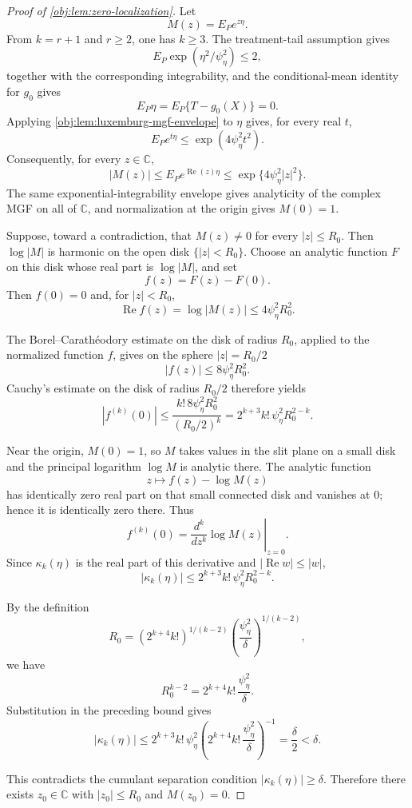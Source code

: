 \documentclass[11pt]{article}
\begin{document}
\begin{proof}[Proof of \cref{obj:lem:zero-localization}]
Let
\[
M(z)=E_Pe^{z\eta}.
\]
From \(k=r+1\) and \(r\ge2\), one has \(k\ge3\).  The treatment-tail assumption gives
\[
E_P\exp(\eta^2/\psi_\eta^2)\le2,
\]
together with the corresponding integrability, and the conditional-mean identity for \(g_0\) gives
\[
E_P\eta=E_P\{T-g_0(X)\}=0.
\]
Applying \cref{obj:lem:luxemburg-mgf-envelope} to \(\eta\) gives, for every real \(t\),
\[
E_Pe^{t\eta}\le \exp(4\psi_\eta^2t^2).
\]
Consequently, for every \(z\in\mathbb C\),
\[
|M(z)|
\le E_Pe^{\operatorname{Re}(z)\eta}
\le \exp\{4\psi_\eta^2|z|^2\}.
\]
The same exponential-integrability envelope gives analyticity of the complex MGF on all of \(\mathbb C\), and normalization at the origin gives \(M(0)=1\).

Suppose, toward a contradiction, that \(M(z)\ne0\) for every \(|z|\le R_0\).  Then \(\log |M|\) is harmonic on the open disk \(\{|z|<R_0\}\).  Choose an analytic function \(F\) on this disk whose real part is \(\log|M|\), and set
\[
f(z)=F(z)-F(0).
\]
Then \(f(0)=0\) and, for \(|z|<R_0\),
\[
\operatorname{Re} f(z)=\log |M(z)|\le 4\psi_\eta^2R_0^2.
\]

The Borel--Carath\'eodory estimate on the disk of radius \(R_0\), applied to the normalized function \(f\), gives on the sphere \(|z|=R_0/2\)
\[
|f(z)|\le 8\psi_\eta^2R_0^2.
\]
Cauchy's estimate on the disk of radius \(R_0/2\) therefore yields
\[
|f^{(k)}(0)|
\le
\frac{k!\,8\psi_\eta^2R_0^2}{(R_0/2)^k}
=
2^{k+3}k!\,\psi_\eta^2R_0^{2-k}.
\]

Near the origin, \(M(0)=1\), so \(M\) takes values in the slit plane on a small disk and the principal logarithm \(\log M\) is analytic there.  The analytic function
\[
z\mapsto f(z)-\log M(z)
\]
has identically zero real part on that small connected disk and vanishes at \(0\); hence it is identically zero there.  Thus
\[
f^{(k)}(0)=\left.\frac{d^k}{dz^k}\log M(z)\right|_{z=0}.
\]
Since \(\kappa_k(\eta)\) is the real part of this derivative and \(|\operatorname{Re} w|\le |w|\),
\[
|\kappa_k(\eta)|
\le 2^{k+3}k!\,\psi_\eta^2R_0^{2-k}.
\]

By the definition
\[
R_0=(2^{k+4}k!)^{1/(k-2)}
       \left(\frac{\psi_\eta^2}{\delta}\right)^{1/(k-2)},
\]
we have
\[
R_0^{k-2}
=
2^{k+4}k!\,\frac{\psi_\eta^2}{\delta}.
\]
Substitution in the preceding bound gives
\[
|\kappa_k(\eta)|
\le
2^{k+3}k!\,\psi_\eta^2
\left(2^{k+4}k!\,\frac{\psi_\eta^2}{\delta}\right)^{-1}
=\frac{\delta}{2}
<\delta.
\]

This contradicts the cumulant separation condition \(|\kappa_k(\eta)|\ge\delta\).  Therefore there exists \(z_0\in\mathbb C\) with \(|z_0|\le R_0\) and \(M(z_0)=0\).
\end{proof}
\end{document}
